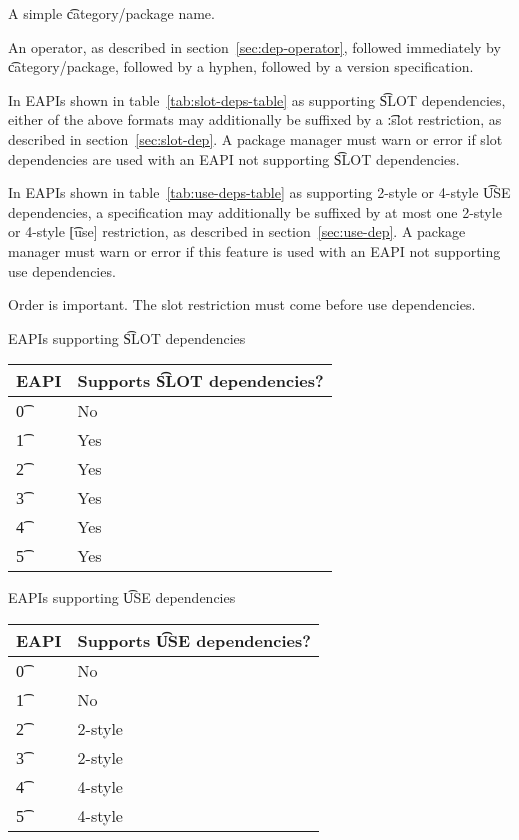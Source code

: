 \begin{compactitem}
\item A simple \t{category/package} name.
\item An operator, as described in section~\ref{sec:dep-operator}, followed immediately by
    \t{category/package}, followed by a hyphen, followed by a version specification.
\end{compactitem}

In EAPIs shown in table~\ref{tab:slot-deps-table} as supporting \t{SLOT} dependencies, either of the
above formats may additionally be suffixed by a \t{:slot} restriction, as described in
section~\ref{sec:slot-dep}. A package manager must warn or error if slot dependencies are used with an
EAPI not supporting \t{SLOT} dependencies.

 In EAPIs shown in table~\ref{tab:use-deps-table} as supporting 2-style
or 4-style \t{USE} dependencies, a specification may additionally be suffixed by at most one
2-style or 4-style \t{[use]} restriction, as described in section~\ref{sec:use-dep}. A package
manager must warn or error if this feature is used with an EAPI not supporting use dependencies.

\note Order is important. The slot restriction must come before use dependencies.

\begin{centertable}{EAPIs supporting \t{SLOT} dependencies} \label{tab:slot-deps-table}
    \begin{tabular}{ l l }
        \toprule
            \multicolumn{1}{c}{\textbf{EAPI}} &
            \multicolumn{1}{c}{\textbf{Supports \t{SLOT} dependencies?}} \\
            \midrule
    \t{0} & No \\
    \t{1} & Yes \\
    \t{2} & Yes \\
    \t{3} & Yes \\
    \t{4} & Yes \\
    \t{5} & Yes \\
    \bottomrule
    \end{tabular}
\end{centertable}

\begin{centertable}{EAPIs supporting \t{USE} dependencies} \label{tab:use-deps-table}
    \begin{tabular}{ l l }
        \toprule
        \multicolumn{1}{c}{\textbf{EAPI}} &
        \multicolumn{1}{c}{\textbf{Supports \t{USE} dependencies?}} \\
        \midrule
    \t{0} & No \\
    \t{1} & No \\
    \t{2} & 2-style \\
    \t{3} & 2-style \\
    \t{4} & 4-style \\
    \t{5} & 4-style \\
    \bottomrule
    \end{tabular}
\end{centertable}

